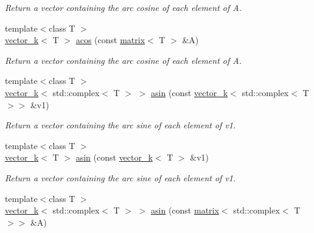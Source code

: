\begin{DoxyCompactItemize}
\begin{DoxyCompactList}\small\item\em Return a vector containing the arc cosine of each element of A. \end{DoxyCompactList}\item 
\hypertarget{namespacekeycpp_a6c07a37d969167a8eafc372d39e84a22}{{\footnotesize template$<$class T $>$ }\\\hyperlink{classkeycpp_1_1vector__k}{vector\-\_\-k}$<$ T $>$ \hyperlink{namespacekeycpp_a6c07a37d969167a8eafc372d39e84a22}{acos} (const \hyperlink{classkeycpp_1_1matrix}{matrix}$<$ T $>$ \&A)}\label{namespacekeycpp_a6c07a37d969167a8eafc372d39e84a22}

\begin{DoxyCompactList}\small\item\em Return a vector containing the arc cosine of each element of A. \end{DoxyCompactList}\item 
\hypertarget{namespacekeycpp_a71aba9c7d78e9bd5c0e7638e6fc526ad}{{\footnotesize template$<$class T $>$ }\\\hyperlink{classkeycpp_1_1vector__k}{vector\-\_\-k}$<$ std\-::complex$<$ T $>$ $>$ \hyperlink{namespacekeycpp_a71aba9c7d78e9bd5c0e7638e6fc526ad}{asin} (const \hyperlink{classkeycpp_1_1vector__k}{vector\-\_\-k}$<$ std\-::complex$<$ T $>$$>$ \&v1)}\label{namespacekeycpp_a71aba9c7d78e9bd5c0e7638e6fc526ad}

\begin{DoxyCompactList}\small\item\em Return a vector containing the arc sine of each element of v1. \end{DoxyCompactList}\item 
\hypertarget{namespacekeycpp_a159ccc6344c3e6dc8c3206890afd47d4}{{\footnotesize template$<$class T $>$ }\\\hyperlink{classkeycpp_1_1vector__k}{vector\-\_\-k}$<$ T $>$ \hyperlink{namespacekeycpp_a159ccc6344c3e6dc8c3206890afd47d4}{asin} (const \hyperlink{classkeycpp_1_1vector__k}{vector\-\_\-k}$<$ T $>$ \&v1)}\label{namespacekeycpp_a159ccc6344c3e6dc8c3206890afd47d4}

\begin{DoxyCompactList}\small\item\em Return a vector containing the arc sine of each element of v1. \end{DoxyCompactList}\item 
\hypertarget{namespacekeycpp_a4de772a2b10be65e2997cbb1f0f08853}{{\footnotesize template$<$class T $>$ }\\\hyperlink{classkeycpp_1_1vector__k}{vector\-\_\-k}$<$ std\-::complex$<$ T $>$ $>$ \hyperlink{namespacekeycpp_a4de772a2b10be65e2997cbb1f0f08853}{asin} (const \hyperlink{classkeycpp_1_1matrix}{matrix}$<$ std\-::complex$<$ T $>$$>$ \&A)}\label{namespacekeycpp_a4de772a2b10be65e2997cbb1f0f08853}


\end{DoxyCompactItemize}
